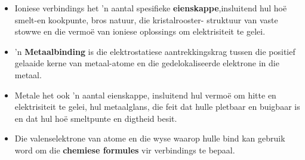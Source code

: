 \begin{itemize}[noitemsep]
\label{m38689*uid152}\item Ioniese verbindings het 'n aantal spesifieke \textbf{eienskappe},insluitend hul hoë smelt-en kookpunte, bros natuur, die kristalrooster- struktuur van vaste stowwe en die vermo\"{e} van ioniese oplossings om elektrisiteit te gelei.
\label{m38689*uid153}\item 'n \textbf{Metaalbinding} is die elektrostatiese aantrekkingskrag tussen die positief gelaaide kerne van metaal-atome en die gedelokaliseerde elektrone in die metaal.
\label{m38689*uid154}\item Metale het ook 'n aantal eienskappe, insluitend hul vermo\"{e} om hitte en elektrisiteit te gelei, hul metaalglans, die feit dat hulle pletbaar en buigbaar is en dat hul ho\"{e} smeltpunte en digtheid besit.
\label{m38689*uid155}\item Die valenselektrone van atome en die wyse waarop hulle bind kan gebruik word om die \textbf{chemiese formules} vir verbindings te bepaal.
\end{itemize}
\label{m38689*secfhsst!!!underscore!!!id1181}
